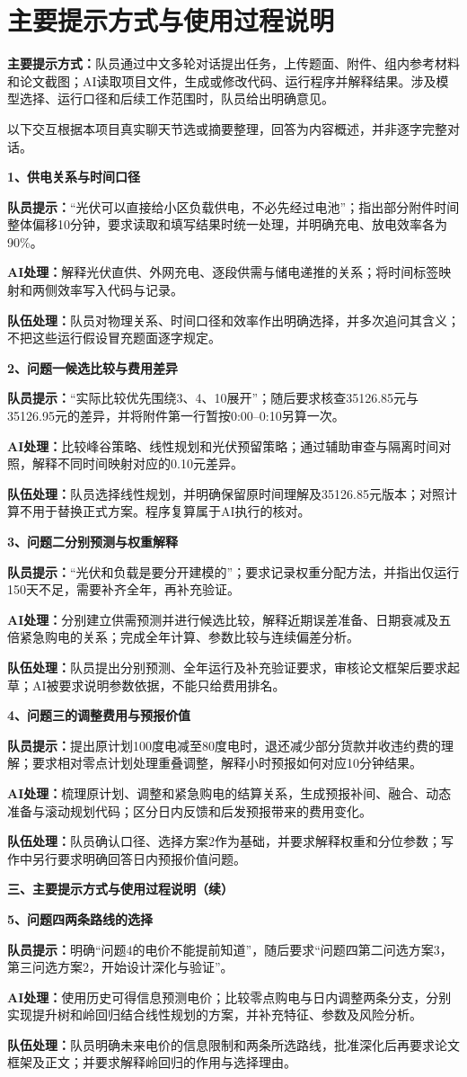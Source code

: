 \documentclass[UTF8,a4paper,12pt]{ctexart}
\newcommand{\field}[2]{\par\noindent\textbf{#1：}#2\par}
\newcommand{\example}[2]{\vspace{6pt}\noindent\textbf{#1、#2}\par}
\begin{document}
\newpage
\section{主要提示方式与使用过程说明}
\field{主要提示方式}{队员通过中文多轮对话提出任务，上传题面、附件、组内参考材料和论文截图；AI读取项目文件，生成或修改代码、运行程序并解释结果。涉及模型选择、运行口径和后续工作范围时，队员给出明确意见。}
以下交互根据本项目真实聊天节选或摘要整理，回答为内容概述，并非逐字完整对话。

\example{1}{供电关系与时间口径}
\field{队员提示}{“光伏可以直接给小区负载供电，不必先经过电池”；指出部分附件时间整体偏移10分钟，要求读取和填写结果时统一处理，并明确充电、放电效率各为90\%。}
\field{AI处理}{解释光伏直供、外网充电、逐段供需与储电递推的关系；将时间标签映射和两侧效率写入代码与记录。}
\field{队伍处理}{队员对物理关系、时间口径和效率作出明确选择，并多次追问其含义；不把这些运行假设冒充题面逐字规定。}

\example{2}{问题一候选比较与费用差异}
\field{队员提示}{“实际比较优先围绕3、4、10展开”；随后要求核查35126.85元与35126.95元的差异，并将附件第一行暂按0:00--0:10另算一次。}
\field{AI处理}{比较峰谷策略、线性规划和光伏预留策略；通过辅助审查与隔离时间对照，解释不同时间映射对应的0.10元差异。}
\field{队伍处理}{队员选择线性规划，并明确保留原时间理解及35126.85元版本；对照计算不用于替换正式方案。程序复算属于AI执行的核对。}

\example{3}{问题二分别预测与权重解释}
\field{队员提示}{“光伏和负载是要分开建模的”；要求记录权重分配方法，并指出仅运行150天不足，需要补齐全年，再补充验证。}
\field{AI处理}{分别建立供需预测并进行候选比较，解释近期误差准备、日期衰减及五倍紧急购电的关系；完成全年计算、参数比较与连续偏差分析。}
\field{队伍处理}{队员提出分别预测、全年运行及补充验证要求，审核论文框架后要求起草；AI被要求说明参数依据，不能只给费用排名。}

\example{4}{问题三的调整费用与预报价值}
\field{队员提示}{提出原计划100度电减至80度电时，退还减少部分货款并收违约费的理解；要求相对零点计划处理重叠调整，解释小时预报如何对应10分钟结果。}
\field{AI处理}{梳理原计划、调整和紧急购电的结算关系，生成预报补间、融合、动态准备与滚动规划代码；区分日内反馈和后发预报带来的费用变化。}
\field{队伍处理}{队员确认口径、选择方案2作为基础，并要求解释权重和分位参数；写作中另行要求明确回答日内预报价值问题。}

\newpage
\noindent\textbf{三、主要提示方式与使用过程说明（续）}

\example{5}{问题四两条路线的选择}
\field{队员提示}{明确“问题4的电价不能提前知道”，随后要求“问题四第二问选方案3，第三问选方案2，开始设计深化与验证”。}
\field{AI处理}{使用历史可得信息预测电价；比较零点购电与日内调整两条分支，分别实现提升树和岭回归结合线性规划的方案，并补充特征、参数及风险分析。}
\field{队伍处理}{队员明确未来电价的信息限制和两条所选路线，批准深化后再要求论文框架及正文；并要求解释岭回归的作用与选择理由。}
\end{document}
